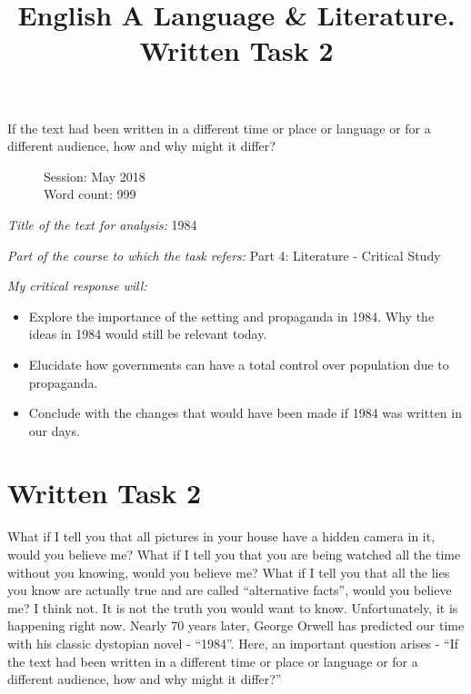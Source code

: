 \documentclass[a4paper,12pt]{article}
\title{English A Language \& Literature. Written Task 2}
\date{}
\author{}
\begin{document}
\maketitle
\begin{center}
If the text had been written in a different time or place or language or for a different audience, how and why might it differ?
\end{center}
\begin{flushleft}
\begin{figure}[b]
Session: May 2018\\
Word count: 999\\
\end{figure}
\end{flushleft}
\singlespacing
\textit{Title of the text for analysis:} 1984

\textit{Part of the course to which the task refers:} Part 4: Literature - Critical Study 

\textit{My critical response will:}

\begin{itemize}

\item Explore the importance of the setting and propaganda in 1984. Why the ideas in 1984 would still be relevant today.

  \item Elucidate how governments can have a total control over population due to propaganda.

  \item Conclude with the changes that would have been made if 1984 was written in our days.
    
  \end{itemize}
\doublespacing
\section*{Written Task 2}

What if I tell you that all pictures in your house have a hidden camera in it, would you believe me?
What if I tell you that you are being watched all the time without you knowing, would you believe me?
What if I tell you that all the lies you know are actually true and are called ``alternative facts'', would you believe me?
I think not.
It is not the truth you would want to know.
Unfortunately, it is happening right now. Nearly 70 years later, George Orwell has predicted our time with his classic dystopian novel - ``1984''.
Here, an important question arises - ``If the text had been written in a different time or place or language or for a different audience, how and why might it differ?'' \\
\end{document}
